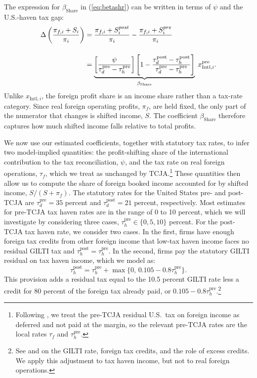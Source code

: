 \documentclass[11pt,letterpaper]{article}
\begin{document}
The expression for $\beta_{\text{Share}}$ in (\ref{eq:betashr})
can be written in terms of $\psi$ and the U.S.-haven tax gap:
\begin{align*}
   \Delta \left(\frac{\pi_{f,i}+S_i}{\pi_i}\right) 
            &= 
               \frac{\pi_{f,i}+S_i^{post}}{\pi_i}
              -\frac{\pi_{f,i}+S_i^{pre}}{\pi_i}\\
  \noalign{\bigskip}
            & = \underbrace{\left[\frac{\psi}{\tau_d^{\text{pre}}-\tau_h^{\text{pre}}}\right]
                 \left[1-\frac{\tau_d^{\text{post}}-\tau_h^{\text{post}}}
                              {\tau_d^{\text{pre}}-\tau_h^{\text{pre}}}\right]}
                _{\beta_{\text{Share}}}\; x^{\text{pre}}_{\text{Intl},i}.
\end{align*}
Unlike $x_{\text{Intl},i}$, the foreign profit share is an
income share rather than a tax-rate category. Since real foreign operating profits,
$\pi_f$, are held fixed, the only part of the numerator that changes is shifted
income, $S$. The coefficient $\beta_{\text{Share}}$ therefore captures how much
shifted income falls relative to total profits.

We now use our estimated coefficients, together with statutory tax rates, to
infer two model-implied quantities: the profit-shifting share of the international
contribution to the tax reconciliation, $\psi$, and the tax
rate on real foreign operations, $\tau_f$, which we treat as unchanged by TCJA.\footnote{%
Following \citet{Hartman1985}, we treat the pre-TCJA residual U.S.~tax on
foreign income as deferred and not paid at the margin, so the relevant pre-TCJA
rates are the local rates $\tau_f$ and $\tau_h^{\text{pre}}$.}
These quantities then allow us to compute the share of foreign booked income accounted
for by shifted income, $S/(S+\pi_f)$.
The statutory rates for the United States pre- and post-TCJA
are $\tau_d^{\text{pre}}=35$ percent and $\tau_d^{\text{post}}=21$ percent, respectively.
Most estimates for pre-TCJA tax haven rates
are in the range of 0 to 10 percent, which we will investigate by considering
three cases, $\tau_h^{\text{pre}}\in \{0,5,10\}$ percent. 
For the post-TCJA tax haven rate, we consider two cases. In the first, firms have
enough foreign tax credits from other foreign income that low-tax haven income
faces no residual GILTI tax and $\tau_h^{\text{post}}=\tau_h^{\text{pre}}$. 
In the second, firms pay the statutory GILTI residual on tax haven income, 
which we model as:
\begin{equation}
   \tau_h^{\text{post}} = \tau_h^{\text{pre}}+\max\{0,\,0.105-0.8\tau_h^{\text{pre}}\}.
\label{eq:tauhpost}
\end{equation}
This provision adds a residual tax equal to the 10.5 percent GILTI rate less a
credit for 80 percent of the foreign tax already paid, or
$0.105-0.8\tau_h^{\text{pre}}$.\footnote{%
See \citet{GravelleGILTI2024} and \citet{Herzfeld2021} on the GILTI rate,
foreign tax credits, and the role of excess credits. We apply this adjustment to
tax haven income, but not to real foreign operations.}
\end{document}
